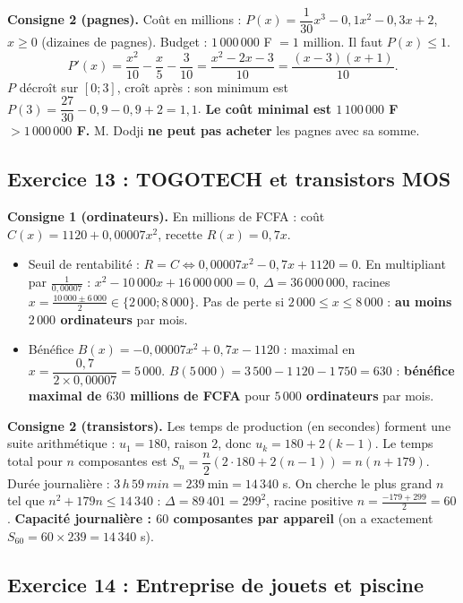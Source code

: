 \textbf{Consigne 2 (pagnes).} Co\^ut en millions : $P(x)=\dfrac{1}{30}x^3-0{,}1x^2-0{,}3x+2$, $x\ge0$ (dizaines de pagnes).
Budget : $1\,000\,000$ F $=1$ million. Il faut $P(x)\le1$.
\[
P'(x)=\frac{x^2}{10}-\frac{x}{5}-\frac{3}{10}=\frac{x^2-2x-3}{10}=\frac{(x-3)(x+1)}{10}.
\]
$P$ d\'ecro\^it sur $[0;3]$, cro\^it apr\`es : son minimum est $P(3)=\dfrac{27}{30}-0{,}9-0{,}9+2=1{,}1$.
\textbf{Le co\^ut minimal est $1\,100\,000$ F $>1\,000\,000$ F.} M. Dodji \textbf{ne peut pas acheter} les pagnes avec sa somme.

\subsection{Exercice 13 : TOGOTECH et transistors MOS}

\textbf{Consigne 1 (ordinateurs).} En millions de FCFA : co\^ut $C(x)=1120+0{,}00007x^2$, recette $R(x)=0{,}7x$.
\begin{itemize}
  \item Seuil de rentabilit\'e : $R=C\iff0{,}00007x^2-0{,}7x+1120=0$. En multipliant par $\frac{1}{0{,}00007}$ :
  $x^2-10\,000x+16\,000\,000=0$, $\Delta=36\,000\,000$, racines $x=\frac{10\,000\pm6\,000}{2}\in\{2\,000;8\,000\}$.
  Pas de perte si $2\,000\le x\le 8\,000$ : \textbf{au moins $2\,000$ ordinateurs} par mois.
  \item B\'en\'efice $B(x)=-0{,}00007x^2+0{,}7x-1120$ : maximal en $x=\dfrac{0{,}7}{2\times0{,}00007}=5\,000$.
  $B(5\,000)=3\,500-1\,120-1\,750=630$ : \textbf{b\'en\'efice maximal de $630$ millions de FCFA} pour \textbf{$5\,000$ ordinateurs} par mois.
\end{itemize}

\textbf{Consigne 2 (transistors).} Les temps de production (en secondes) forment une suite arithm\'etique :
$u_1=180$, raison $2$, donc $u_k=180+2(k-1)$.
Le temps total pour $n$ composantes est $S_n=\dfrac{n}{2}(2\cdot180+2(n-1))=n(n+179)$.
Dur\'ee journali\`ere : $3\,h\,59\,min=239\ \text{min}=14\,340$ s.
On cherche le plus grand $n$ tel que $n^2+179n\le14\,340$ : $\Delta=89\,401=299^2$, racine positive $n=\frac{-179+299}{2}=60$.
\textbf{Capacit\'e journali\`ere : $60$ composantes par appareil} (on a exactement $S_{60}=60\times239=14\,340$ s).

\subsection{Exercice 14 : Entreprise de jouets et piscine}

